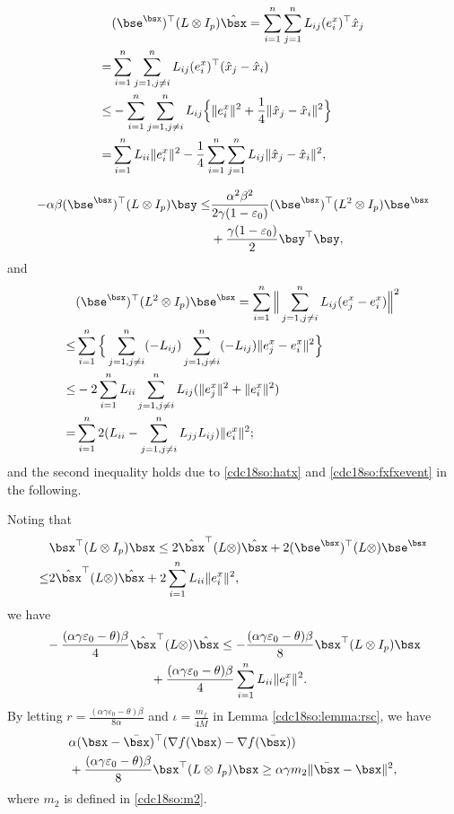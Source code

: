 \documentclass[letterpaper, 10 pt, conference]{ieeeconf}  %
\begin{document}
\begin{align*}
&(\bse^{\bsx})^\top (L \otimes I_p)\hat{\bsx}
=\sum_{i=1}^n\sum_{j=1}^nL_{ij}(e^{x}_i)^\top\hat{x}_j\\
=&\sum_{i=1}^n\sum_{j=1,j\neq i}^nL_{ij}(e^{x}_i)^\top(\hat{x}_j-\hat{x}_i)\\
\le&-\sum_{i=1}^n\sum_{j=1,j\neq i}^nL_{ij}\Big\{\|e^{x}_i\|^2+\frac{1}{4}\|\hat{x}_j-\hat{x}_i\|^2\Big\}\\
=&\sum_{i=1}^nL_{ii}\|e^{x}_i\|^2
-\frac{1}{4}\sum_{i=1}^n\sum_{j=1}^nL_{ij}\|\hat{x}_j
-\hat{x}_i\|^2,
\end{align*}

\begin{align*}
-\alpha\beta (\bse^\bsx)^\top(L\otimes I_p)\bsy\le&\frac{\alpha^2\beta^2}{2\gamma(1-\varepsilon_0)}(\bse^\bsx)^\top(L^2\otimes I_p)\bse^\bsx\\
&+\frac{\gamma(1-\varepsilon_0)}{2}\bsy^\top \bsy,
\end{align*}
and
\begin{align*}
&(\bse^\bsx)^\top(L^2\otimes I_p)\bse^\bsx=\sum_{i=1}^n\Big\|\sum_{j=1,j\neq i}^nL_{ij}(e^{x}_j-e^{x}_i)\Big\|^2\\
\le&\sum_{i=1}^n\Big\{\sum_{j=1,j\neq i}^n(-L_{ij})\sum_{j=1,j\neq i}^n(-L_{ij})\|e^{x}_j-e^{x}_i\|^2\Big\}\\
\le&-2\sum_{i=1}^nL_{ii}\sum_{j=1,j\neq i}^nL_{ij}(\|e^{x}_j\|^2+\|e^{x}_i\|^2)\\
=&\sum_{i=1}^n2(L_{ii}-\sum_{j=1,j\neq i}^nL_{jj}L_{ij})\|e^{x}_i\|^2;
\end{align*}
and the second inequality holds due to \eqref{cdc18so:hatx} and \eqref{cdc18so:fxfxevent} in the following.

Noting that
\begin{align*}
&\bsx^\top(L\otimes I_p)\bsx\le2\hat{\bsx}^\top(L\otimes)\hat{\bsx}+2(\bse^\bsx)^\top(L\otimes)\bse^\bsx\\
\le&2\hat{\bsx}^\top(L\otimes)\hat{\bsx}+2\sum_{i=1}^nL_{ii}\|e^x_i\|^2,
\end{align*}
we have
\begin{align}\label{cdc18so:hatx}
&-\frac{(\alpha\gamma\varepsilon_0-\theta)\beta}{4}\hat{\bsx}^\top(L\otimes)\hat{\bsx}
\le-\frac{(\alpha\gamma\varepsilon_0-\theta)\beta}{8}\bsx^\top(L\otimes I_p)\bsx\nonumber\\
&~~~~~~~~~~~~~~~~~~~~~~~~~+\frac{(\alpha\gamma\varepsilon_0-\theta)\beta}{4}\sum_{i=1}^nL_{ii}\|e^x_i\|^2.
\end{align}
By letting $r=\frac{(\alpha\gamma\varepsilon_0-\theta)\beta}{8\alpha}$ and $\iota=\frac{m_f}{4\overline{M}}$ in Lemma \ref{cdc18so:lemma:rsc}, we have
\begin{align}
&\alpha(\bsx-\bar{\bsx})^\top(\nabla f(\bsx)-\nabla f(\bar{\bsx}))\nonumber\\
&+\frac{(\alpha\gamma\varepsilon_0-\theta)\beta}{8}\bsx^\top(L\otimes I_p)\bsx
\ge \alpha\gamma m_2\|\bar{\bsx}-\bsx\|^2,\label{cdc18so:fxfxevent}
\end{align}
where $m_2$ is defined in \eqref{cdc18so:m2}.
\end{document}
